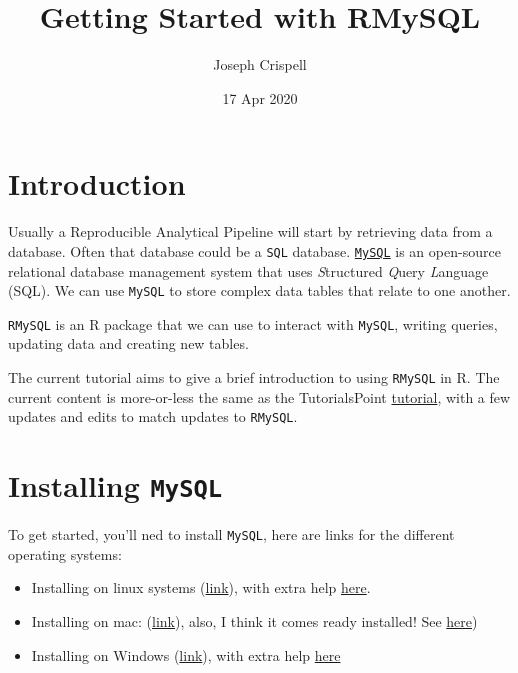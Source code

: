 \documentclass[
]{article}
\title{Getting Started with RMySQL}
\author{Joseph Crispell}
\date{17 Apr 2020}
\providecommand{\tightlist}{%
  \setlength{\itemsep}{0pt}\setlength{\parskip}{0pt}}
\begin{document}
\maketitle

{
\setcounter{tocdepth}{2}
\tableofcontents
}
\hypertarget{introduction}{%
\section{Introduction}\label{introduction}}

Usually a Reproducible Analytical Pipeline will start by retrieving data
from a database. Often that database could be a \texttt{SQL} database.
\href{https://www.mysql.com/}{\texttt{MySQL}} is an open-source
relational database management system that uses \emph{S}tructured
\emph{Q}uery \emph{L}anguage (SQL). We can use \texttt{MySQL} to store
complex data tables that relate to one another.

\texttt{RMySQL} is an R package that we can use to interact with
\texttt{MySQL}, writing queries, updating data and creating new tables.

The current tutorial aims to give a brief introduction to using
\texttt{RMySQL} in R. The current content is more-or-less the same as
the TutorialsPoint
\href{https://www.tutorialspoint.com/r/r_database.htm}{tutorial}, with a
few updates and edits to match updates to \texttt{RMySQL}.

\hypertarget{installing-mysql}{%
\section{\texorpdfstring{Installing
\texttt{MySQL}}{Installing MySQL}}\label{installing-mysql}}

To get started, you'll ned to install \texttt{MySQL}, here are links for
the different operating systems:

\begin{itemize}
\tightlist
\item
  Installing on linux systems
  (\href{https://dev.mysql.com/doc/refman/8.0/en/linux-installation.html}{link}),
  with extra help
  \href{https://itsfoss.com/install-mysql-ubuntu/}{here}.
\item
  Installing on mac:
  (\href{https://dev.mysql.com/doc/mysql-osx-excerpt/5.7/en/osx-installation.html}{link}),
  also, I think it comes ready installed! See
  \href{https://www.thoughtco.com/installing-mysql-on-mac-2693866}{here})
\item
  Installing on Windows
  (\href{https://dev.mysql.com/downloads/installer/}{link}), with extra
  help
  \href{https://www.wikihow.com/Install-the-MySQL-Database-Server-on-Your-Windows-PC}{here}
\end{itemize}
\end{document}
